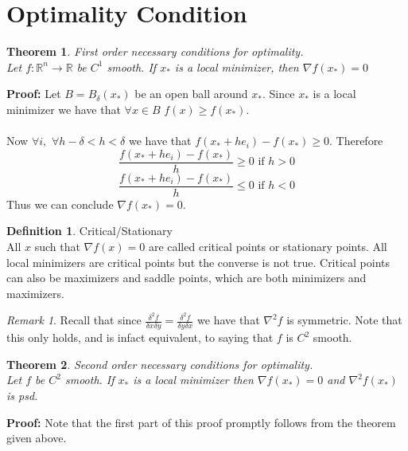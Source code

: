 \documentclass[titlepage]{article}
\theoremstyle{plain}
\newtheorem{thm}{Theorem}[section]
\theoremstyle{definition}
\newtheorem{defn}{Definition}[section]
\theoremstyle{remark}
\newtheorem*{rem}{Remark}
\begin{document}
\section{Optimality Condition}
\begin{thm} First order necessary conditions for optimality.\\
Let $f : \mathbb{R}^n \to \mathbb{R}$ be $C^1$ smooth. If $x_*$ is a local minimizer, then $\nabla f(x_*) = 0$
\end{thm}
\noindent \textbf{Proof: } Let $B = B_\delta(x_*)$ be an open ball around $x_*$. Since $x_*$
is a local minimizer we have that $\forall x \in B$ $f(x) \geq f(x_*)$.\\\\
Now $\forall i,$ $\forall h -\delta < h < \delta$ we have that $f(x_* + h e_i) -
f(x_*) \geq 0$. Therefore
\[\frac{f(x_* + h e_i) - f(x_*)}{h} \geq 0 \text{ if } h > 0\]
\[\frac{f(x_* + h e_i) - f(x_*)}{h} \leq 0 \text{ if } h < 0\]
Thus we can conclude $\nabla f(x_*) = 0$.
\begin{defn} Critical/Stationary\\
All $x$ such that $\nabla f(x) = 0$ are called critical points or stationary
points. All local minimizers are critical points but the converse is not true.
Critical points can also be maximizers and saddle points, which are both
minimizers and maximizers.
\end{defn}
\begin{rem}
Recall that since $\frac{\delta^2 f}{\delta x \delta y} = \frac{\delta^2
f}{\delta y \delta x}$ we have that $\nabla^2 f$ is symmetric. Note that this
only holds, and is infact equivalent, to saying that $f$ is $C^2$ smooth.
\end{rem}
\begin{thm} Second order necessary conditions for optimality.\\
Let $f$ be $C^2$ smooth. If $x_*$ is a local minimizer then $\nabla f(x_*) = 0 $
and $\nabla^2 f(x_*)$ is psd.
\end{thm}
\noindent \textbf{Proof: } Note that the first part of this proof promptly
follows from the theorem given above.\\
\end{document}
